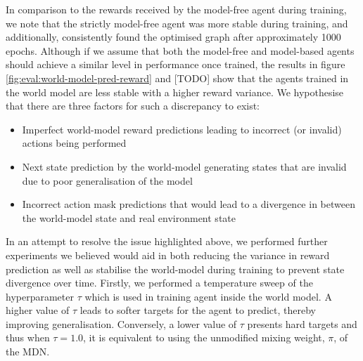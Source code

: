 In comparison to the rewards received by the model-free agent during training, we note that the strictly model-free agent was more stable during training, and additionally, consistently found the optimised graph after approximately 1000 epochs. Although if we assume that both the model-free and model-based agents should achieve a similar level in performance once trained, the results in figure \ref{fig:eval:world-model-pred-reward} and [TODO] show that the agents trained in the world model are less stable with a higher reward variance. We hypothesise that there are three factors for such a discrepancy to exist:

\begin{itemize}
  \item Imperfect world-model reward predictions leading to incorrect (or invalid) actions being performed
  \item Next state prediction by the world-model generating states that are invalid due to poor generalisation of the model
  \item Incorrect action mask predictions that would lead to a divergence in between the world-model state and real environment state 
\end{itemize}

In an attempt to resolve the issue highlighted above, we performed further experiments we believed would aid in both reducing the variance in reward prediction as well as stabilise the world-model during training to prevent state divergence over time. Firstly, we performed a temperature sweep of the hyperparameter $\tau$ which is used in training agent inside the world model. A higher value of $\tau$ leads to softer targets for the agent to predict, thereby improving generalisation. Conversely, a lower value of $\tau$ presents hard targets and thus when $\tau = 1.0$, it is equivalent to using the unmodified mixing weight, $\pi$, of the MDN.   

